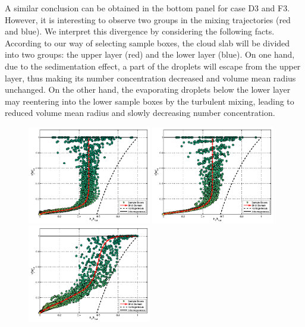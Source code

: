 \documentclass[draft,jgrga]{AGUTeX}
\begin{document}
\begin{article}
A similar conclusion can be obtained in the bottom panel for case D3 and F3. However, it is interesting to observe two groups in the mixing trajectories (red and blue). We interpret this divergence by considering the following facts. According to our way of selecting sample boxes, the cloud slab will be divided into two groups: the upper layer (red) and the lower layer (blue). On one hand, due to the sedimentation effect, a part of the droplets will escape from the upper layer, thus making its number concentration decreased and volume mean radius unchanged. On the other hand, the evaporating droplets below the lower layer may reentering into the lower sample boxes by the turbulent mixing, leading to reduced volume mean radius and slowly decreasing number concentration.
\begin{figure}\centering
\includegraphics[width=0.48\textwidth]{Figures/mixing_cased1}
\includegraphics[width=0.48\textwidth]{Figures/mixing_casef1}\\
\includegraphics[width=0.48\textwidth]{Figures/mixing_cased2}

\end{figure}
\end{article}
\end{document}
